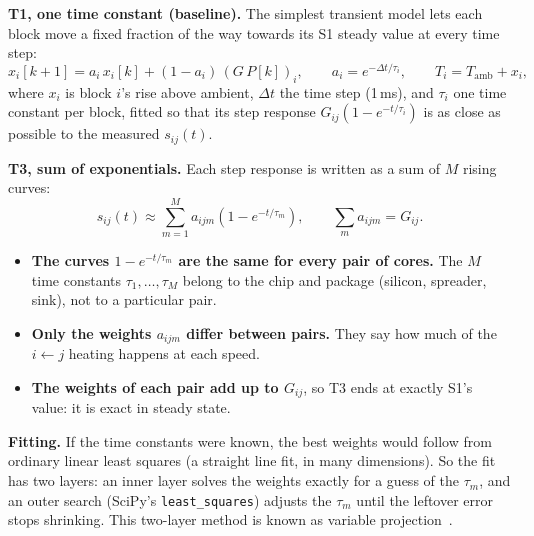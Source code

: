 \documentclass[11pt,a4paper]{article}
\begin{document}
\textbf{T1, one time constant (baseline).} The simplest transient model lets each block move a
fixed fraction of the way towards its S1 steady value at every time step:
\begin{equation}
  x_i[k+1] = a_i\, x_i[k] + (1 - a_i)\,(G\,P[k])_i, \qquad a_i = e^{-\Delta t/\tau_i},
  \qquad T_i = T_\text{amb} + x_i,
  \label{eq:t1}
\end{equation}
where $x_i$ is block $i$'s rise above ambient, $\Delta t$ the time step (1\,ms), and $\tau_i$ one
time constant per block, fitted so that its step response $G_{ij}(1 - e^{-t/\tau_i})$ is as close
as possible to the measured $s_{ij}(t)$.

\textbf{T3, sum of exponentials.} Each step response is written as a sum of $M$ rising curves:
\begin{equation}
  s_{ij}(t) \approx \sum_{m=1}^{M} a_{ijm}\left(1 - e^{-t/\tau_m}\right),
  \qquad \sum_m a_{ijm} = G_{ij}.
  \label{eq:t3}
\end{equation}
\begin{itemize}
  \item \textbf{The curves $1 - e^{-t/\tau_m}$ are the same for every pair of cores.} The $M$ time
        constants $\tau_1, \dots, \tau_M$ belong to the chip and package (silicon, spreader, sink),
        not to a particular pair.
  \item \textbf{Only the weights $a_{ijm}$ differ between pairs.} They say how much of the
        $i \leftarrow j$ heating happens at each speed.
  \item \textbf{The weights of each pair add up to $G_{ij}$}, so T3 ends at exactly S1's value:
        it is exact in steady state.
\end{itemize}
\textbf{Fitting.} If the time constants were known, the best weights would follow from ordinary
linear least squares (a straight line fit, in many dimensions). So the fit has two layers: an inner
layer solves the weights exactly for a guess of the $\tau_m$, and an outer search (SciPy's
\texttt{least\_squares}) adjusts the $\tau_m$ until the leftover error stops shrinking. This
two-layer method is known as variable projection~\cite{golub73}.
\end{document}
